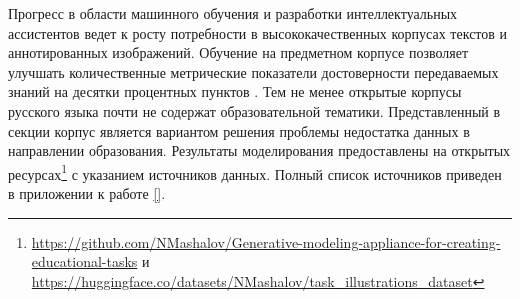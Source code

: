 Прогресс в области машинного обучения и разработки интеллектуальных ассистентов ведет к росту потребности в
высококачественных корпусах текстов и аннотированных изображений. Обучение на предметном корпусе
позволяет улучшать количественные метрические показатели достоверности передаваемых знаний 
на десятки процентных пунктов \cite{tinn2023fine}. Тем не менее открытые корпусы русского языка 
\cite{hung2022multi2woz} \cite{dmitrieva2023automatic} \cite{ivanov2023new} почти не содержат образовательной тематики.
Представленный в секции корпус является вариантом решения проблемы недостатка данных в направлении образования. 
Результаты моделирования предоставлены на открытых ресурсах\footnote{
\url{https://github.com/NMashalov/Generative-modeling-appliance-for-creating-educational-tasks}
и \url{https://huggingface.co/datasets/NMashalov/task_illustrations_dataset}
} с указанием источников данных. Полный список источников приведен в приложении к работе \ref{}.

 
